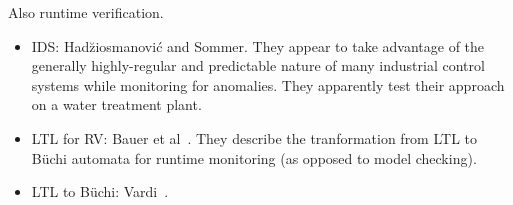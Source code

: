 Also runtime verification.

\begin{itemize}

\item IDS: Had\u ziosmanovi\'c and Sommer. They appear to take advantage of the
generally highly-regular and predictable nature of many industrial control
systems while monitoring for anomalies. They apparently test their approach on a
water treatment plant.


\item LTL for RV: Bauer et al~\cite{bauer:rv_ltl}. They describe the tranformation from LTL
to B\"uchi automata for runtime monitoring (as opposed to model checking).

\item LTL to B\"uchi: Vardi~\cite{vardi:ltl_at}.

\end{itemize}

